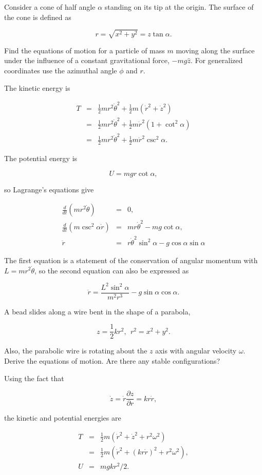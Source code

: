 \documentclass[%
oneside,                 %
final,                   %
10pt]{article}
\begin{document}
Consider a cone of half angle $\alpha$ standing on its tip at the
origin. The surface of the cone is defined as

\[
r=\sqrt{x^2+y^2}=z\tan \alpha.
\]

Find the equations of motion for a particle of mass $m$ moving along the surface under the influence of a constant gravitational force, $-mg\hat{z}$. For generalized coordinates use the azimuthal angle $\phi$ and $r$.

The kinetic energy is 

\begin{eqnarray*}
T&=&\frac{1}{2}mr^2\dot{\theta}^2+\frac{1}{2}m(\dot{r}^2+\dot{z}^2)\\
&=&\frac{1}{2}mr^2\dot{\theta}^2+\frac{1}{2}m\dot{r}^2\left(1+\cot^2\alpha\right)\\
&=&\frac{1}{2}mr^2\dot{\theta}^2+\frac{1}{2}m\dot{r}^2\csc^2\alpha.
\end{eqnarray*}

The potential energy is 

\[
U=mgr\cot\alpha,
\]

so Lagrange's equations give

\begin{eqnarray*}
\frac{d}{dt}\left(mr^2\dot{\theta}\right)&=&0,\\
\frac{d}{dt}\left(m\csc^2\alpha \dot{r}\right)&=&mr\dot{\theta}^2-mg\cot\alpha,\\
\ddot{r}&=&r\dot{\theta}^2\sin^2\alpha-g\cos\alpha\sin\alpha
\end{eqnarray*}

The first equation is a statement of the conservation of angular
momentum with $L=mr^2\dot{\theta}$, so the second equation can also be
expressed as

\[
\ddot{r}=\frac{L^2\sin^2\alpha}{m^2r^3}-g\sin\alpha\cos\alpha.
\]

A bead slides along a wire bent in the shape of a parabola, 

\[
z=\frac{1}{2}kr^2,~~r^2=x^2+y^2.
\]

Also, the parabolic wire is rotating about the $z$ axis with angular
velocity $\omega$. Derive the equations of motion. Are there any
stable configurations?

Using the fact that

\[
\dot{z}=\dot{r}\frac{\partial z}{\partial r}=kr\dot{r},
\]

the kinetic and potential energies are

\begin{eqnarray*}
T&=&\frac{1}{2}m\left(\dot{r}^2+\dot{z}^2+r^2\omega^2\right)\\
&=&\frac{1}{2}m\left(\dot{r}^2+(kr\dot{r})^2+r^2\omega^2\right),\\
U&=&mgkr^2/2.
\end{eqnarray*}
\end{document}

